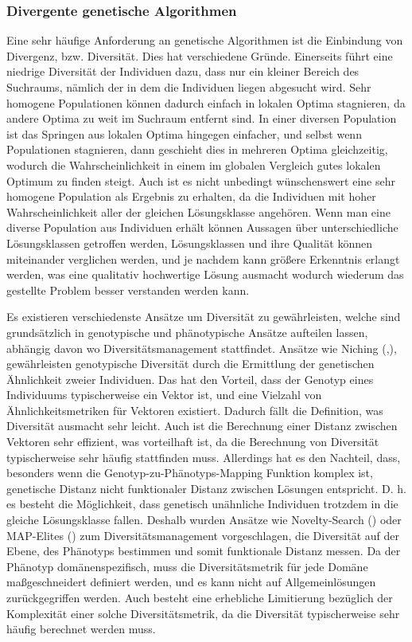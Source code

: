 \subsubsection{Divergente genetische Algorithmen}

\label{sub:divergentGeneticAlgorithms}

Eine sehr häufige Anforderung an genetische Algorithmen ist die Einbindung von Divergenz, bzw. Diversität.
Dies hat verschiedene Gründe.
Einerseits führt eine niedrige Diversität der Individuen dazu, dass nur ein kleiner Bereich des Suchraums, nämlich der in dem die Individuen liegen abgesucht wird.
Sehr homogene Populationen können dadurch einfach in lokalen Optima stagnieren, da andere Optima zu weit im Suchraum entfernt sind.
In einer diversen Population ist das Springen aus lokalen Optima hingegen einfacher, und selbst wenn Populationen stagnieren, dann geschieht dies in mehreren Optima gleichzeitig, wodurch die Wahrscheinlichkeit in einem im globalen Vergleich gutes lokalen Optimum zu finden steigt.
Auch ist es nicht unbedingt wünschenswert eine sehr homogene Population als Ergebnis zu erhalten, da die Individuen mit hoher Wahrscheinlichkeit aller der gleichen Lösungsklasse angehören.
Wenn man eine diverse Population aus Individuen erhält können Aussagen über unterschiedliche Lösungsklassen getroffen werden, Lösungsklassen und ihre Qualität können miteinander verglichen werden, und je nachdem kann größere Erkenntnis erlangt werden, was eine qualitativ hochwertige Lösung ausmacht wodurch wiederum das gestellte Problem besser verstanden werden kann.

Es existieren verschiedenste Ansätze um Diversität zu gewährleisten, welche sind grundsätzlich in genotypische und phänotypische Ansätze aufteilen lassen, abhängig davon wo Diversitätsmanagement stattfindet.
Ansätze wie Niching (\cite{Mahfoud.1996},\cite{Shir.2012}), gewährleisten genotypische Diversität durch die Ermittlung der genetischen Ähnlichkeit zweier Individuen.
Das hat den Vorteil, dass der Genotyp eines Individuums typischerweise ein Vektor ist, und eine Vielzahl von Ähnlichkeitsmetriken für Vektoren existiert.
Dadurch fällt die Definition, was Diversität ausmacht sehr leicht.
Auch ist die Berechnung einer Distanz zwischen Vektoren sehr effizient, was vorteilhaft ist, da die Berechnung von Diversität typischerweise sehr häufig stattfinden muss.
Allerdings hat es den Nachteil, dass, besonders wenn die Genotyp-zu-Phänotyps-Mapping Funktion komplex ist, genetische Distanz nicht funktionaler Distanz zwischen Lösungen entspricht.
D. h. es besteht die Möglichkeit, dass genetisch unähnliche Individuen trotzdem in die gleiche Lösungsklasse fallen.
Deshalb wurden Ansätze wie Novelty-Search (\cite{Lehman.2011}) oder MAP-Elites (\cite{Mouret.4202015}) zum Diversitätsmanagement vorgeschlagen, die Diversität auf der Ebene, des Phänotyps bestimmen und somit funktionale Distanz messen.
Da der Phänotyp domänenspezifisch,  muss die Diversitätsmetrik für jede Domäne maßgeschneidert definiert werden, und es kann nicht auf Allgemeinlösungen zurückgegriffen werden.
Auch besteht eine erhebliche Limitierung bezüglich der Komplexität einer solche Diversitätsmetrik, da die Diversität typischerweise sehr häufig berechnet werden muss.

